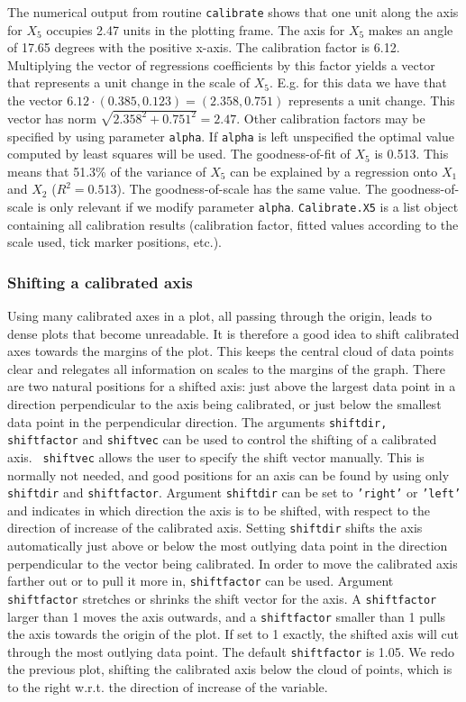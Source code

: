 \documentclass[a4paper]{article}
\begin{document}
The numerical output from routine {\tt calibrate} shows that one unit along the axis for $X_5$ occupies 2.47
units in the plotting frame. The axis for $X_5$ makes an angle of 17.65 degrees with the positive x-axis.
The calibration factor is 6.12. Multiplying the vector of regressions coefficients by this
factor yields a vector that represents a unit change in the scale of $X_5$. E.g. for this data we have that 
the vector $6.12 \cdot (0.385, 0.123) = (2.358, 0.751)$ represents a unit change. This vector has
norm $\sqrt{2.358^2 + 0.751^2} = 2.47$. Other calibration factors may be specified by using parameter
{\tt alpha}. If {\tt alpha} is left unspecified the optimal value computed by least
squares will be used. The goodness-of-fit of $X_5$ is 0.513. This means that 51.3\% of the variance
of $X_5$ can be explained by a regression onto $X_1$ and $X_2$ ($R^2 = 0.513$). The goodness-of-scale has
the same value. The goodness-of-scale is only relevant if we modify parameter {\tt alpha}. {\tt Calibrate.X5}
is a list object containing all calibration results (calibration factor, fitted values according to the
scale used, tick marker positions, etc.).

\subsubsection*{Shifting a calibrated axis}

Using many calibrated axes in a plot, all passing through the origin, leads to dense plots that become
unreadable. It is therefore a good idea to shift calibrated axes towards the margins of the plot. This keeps
the central cloud of data points clear and relegates all information on scales to the margins of the graph.
There are two natural positions for a shifted axis: just above the largest data point in a direction perpendicular
to the axis being calibrated, or just below the smallest data point in the perpendicular direction. The arguments
{\tt shiftdir, shiftfactor} and {\tt shiftvec} can be used to control the shifting of a calibrated axis. {\tt 
shiftvec} allows the user to specify the shift vector manually. This is normally not needed, and good positions
for an axis can be found by using only {\tt shiftdir} and {\tt shiftfactor}. Argument {\tt shiftdir} can be set 
to {\tt 'right'} or {\tt 'left'} and indicates in which direction the axis is to be shifted, with respect to the direction of 
increase of the calibrated axis. Setting {\tt shiftdir} shifts the axis automatically just above or below 
the most outlying data point in the direction perpendicular to the vector being calibrated. In order to
move the calibrated axis farther out or to pull it more in, {\tt shiftfactor} can be used. 
Argument {\tt shiftfactor} stretches or shrinks the shift vector for the axis. A {\tt shiftfactor} larger
than 1 moves the axis outwards, and a {\tt shiftfactor} smaller than 1 pulls the axis towards the origin of
the plot. If set to 1 exactly, the shifted axis will cut through the most outlying data point. 
The default {\tt shiftfactor} is 1.05. We redo
the previous plot, shifting the calibrated axis below the cloud of points, which is to the right w.r.t. the 
direction of increase of the variable.
\end{document}
